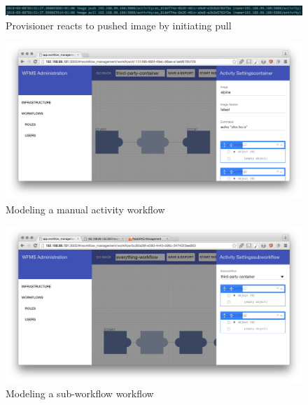   \begin{figure}[htbp]
    \centering
    \includegraphics[width=\textwidth]{./content/images/usecase/case_study_13.png}
    \caption{Provisioner reacts to pushed image by initiating pull}
    \label{fig:provisioner_pulls}
  \end{figure}

  \begin{figure}[htbp]
    \centering
    \includegraphics[width=\textwidth]{./content/images/usecase/case_study_10.png}
    \caption{Modeling a manual activity workflow}
    \label{fig:manual_wf}
  \end{figure}

  \begin{figure}[htbp]
    \centering
    \includegraphics[width=\textwidth]{./content/images/usecase/case_study_26.png}
    \caption{Modeling a sub-workflow workflow}
    \label{fig:subwf_wf}
  \end{figure}

